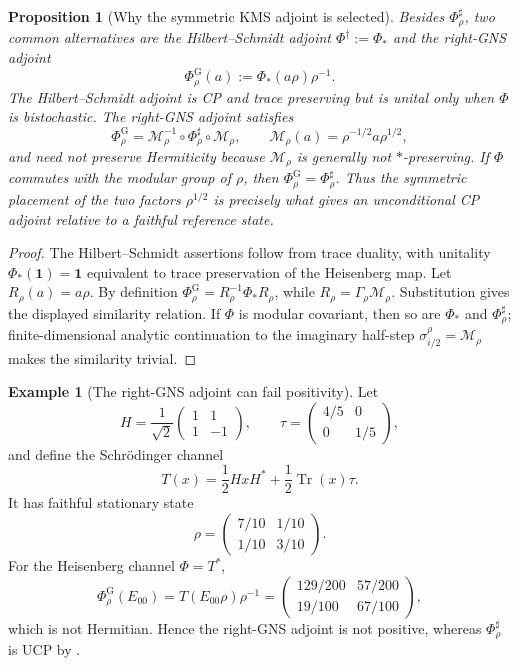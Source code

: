 \documentclass[11pt]{article}
\newtheorem{proposition}[theorem]{Proposition}
\theoremstyle{definition}
\newtheorem{example}[theorem]{Example}
\theoremstyle{remark}
\newcommand{\one}{\mathbf 1}
\newcommand{\Tr}{\operatorname{Tr}}
\begin{document}
\begin{proposition}[Why the symmetric KMS adjoint is selected]
\label{prop:reverse-comparison}
Besides $\Phi_\rho^\sharp$, two common alternatives are the Hilbert--Schmidt
adjoint $\Phi^\dagger:=\Phi_*$ and the right-GNS adjoint
\[
 \Phi_\rho^{\mathrm G}(a):=\Phi_*(a\rho)\rho^{-1}.
\]
The Hilbert--Schmidt adjoint is CP and trace preserving but is unital only when
$\Phi$ is bistochastic.  The right-GNS adjoint satisfies
\[
 \Phi_\rho^{\mathrm G}
 =\mathcal M_\rho^{-1}\circ\Phi_\rho^\sharp\circ\mathcal M_\rho,
 \qquad
 \mathcal M_\rho(a)=\rho^{-1/2}a\rho^{1/2},
\]
and need not preserve Hermiticity because $\mathcal M_\rho$ is generally not
$*$-preserving.  If $\Phi$ commutes with the modular group of $\rho$, then
$\Phi_\rho^{\mathrm G}=\Phi_\rho^\sharp$.  Thus the symmetric placement of the
two factors $\rho^{1/2}$ is precisely what gives an unconditional CP adjoint
relative to a faithful reference state.
\end{proposition}

\begin{proof}
The Hilbert--Schmidt assertions follow from trace duality, with unitality
$\Phi_*(\one)=\one$ equivalent to trace preservation of the Heisenberg map.
Let $R_\rho(a)=a\rho$.  By definition
$\Phi_\rho^{\mathrm G}=R_\rho^{-1}\Phi_*R_\rho$, while
$R_\rho=\Gamma_\rho\mathcal M_\rho$.  Substitution gives the displayed
similarity relation.  If $\Phi$ is modular covariant, then so are $\Phi_*$ and
$\Phi_\rho^\sharp$; finite-dimensional analytic continuation to the imaginary
half-step $\sigma_{i/2}^\rho=\mathcal M_\rho$ makes the similarity trivial.
\end{proof}

\begin{example}[The right-GNS adjoint can fail positivity]
\label{ex:gns-not-positive}
Let
\[
 H=\frac1{\sqrt2}\begin{pmatrix}1&1\\1&-1\end{pmatrix},
 \qquad
 \tau=\begin{pmatrix}4/5&0\\0&1/5\end{pmatrix},
\]
and define the Schr\"odinger channel
\[
 T(x)=\frac12HxH^*+\frac12\Tr(x)\tau.
\]
It has faithful stationary state
\[
 \rho=\begin{pmatrix}7/10&1/10\\1/10&3/10\end{pmatrix}.
\]
For the Heisenberg channel $\Phi=T^*$,
\[
 \Phi_\rho^{\mathrm G}(E_{00})
 =T(E_{00}\rho)\rho^{-1}
 =\begin{pmatrix}129/200&57/200\\19/100&67/100\end{pmatrix},
\]
which is not Hermitian.  Hence the right-GNS adjoint is not positive, whereas
$\Phi_\rho^\sharp$ is UCP by .
\end{example}
\end{document}
